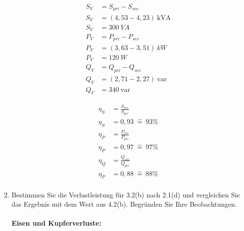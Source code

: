 \begin{enumerate}[label=\alph*)]
	      \begin{minipage}[r]{0.5\linewidth}
		      \begin{align*}
			      S_{V} & = S_{pri} - S_{sec}         \\
			      S_{V} & = (4,53 - 4,23)\ \text{kVA} \\
			      S_{V} & = 300\ VA                   \\
			      P_{V} & = P_{pri} - P_{sec}         \\
			      P_{V} & = (3,63 - 3,51)\ kW         \\
			      P_{V} & = 120\ W                    \\
			      Q_{V} & = Q_{pri} - Q_{sec}         \\
			      Q_{V} & = (2,71 - 2,27)\ \text{var} \\
			      Q_{V} & = 340\ \text{var}
		      \end{align*}
	      \end{minipage}
	      \begin{minipage}[l]{0.5\linewidth}
		      \begin{align*}
			      \eta_S & = \frac{S_{sec}}{S_{pri}} \\
			      \eta_S & = 0,93\ \widehat{=}\ 93\% \\
			      \eta_P & = \frac{P_{sec}}{P_{pri}} \\
			      \eta_P & = 0,97\ \widehat{=}\ 97\% \\
			      \eta_Q & = \frac{Q_{sec}}{Q_{pri}} \\
			      \eta_P & = 0,88\ \widehat{=}\ 88\% \\
		      \end{align*}
	      \end{minipage}

	\item Bestimmen Sie die Verlustleistung für 3.2(b) nach 2.1(d) und vergleichen Sie
	      das Ergebnis mit dem Wert aus 4.2(b). Begründen Sie Ihre Beobachtungen.\\ \ \\
	      \textbf{Eisen und Kupferverluste:}\\ \ \\
	      \begin{tcolorbox}[colback=gray!30,
			      colframe=black,
			      width=0.9\textwidth,
		      ]
		      \parbox{\textwidth}{

}
\end{tcolorbox}
\end{enumerate}
